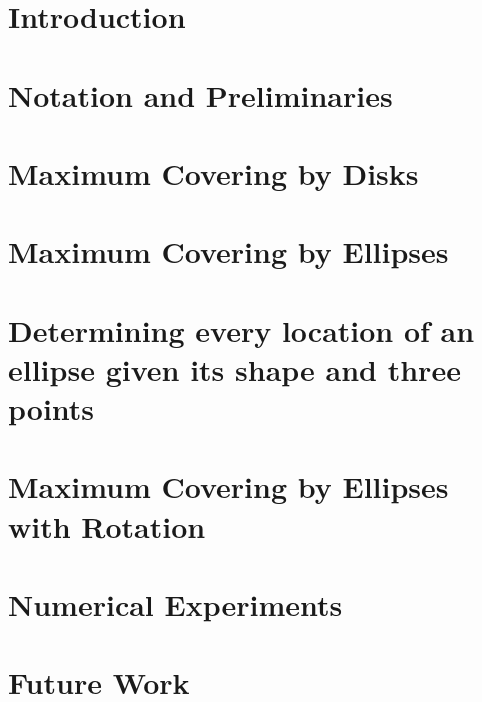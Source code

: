 \documentclass[mestrado]{packages/icmc}
\begin{document}
\textual

\chapter{Introduction}
\label{chapter:introduction}


\chapter{Notation and Preliminaries}
\label{chapter:definitions}


\chapter{Maximum Covering by Disks}
\label{chapter:pmclp}


\chapter{Maximum Covering by Ellipses}
\label{chapter:mce}


\chapter{Determining every location of an ellipse given its shape and three points}
\label{chapter:e3p}


\chapter{Maximum Covering by Ellipses with Rotation}
\label{chapter:mcer}


\chapter{Numerical Experiments}
\label{chapter:numerical}


\chapter{Future Work}
\label{chapter:future_work}

\end{document}
